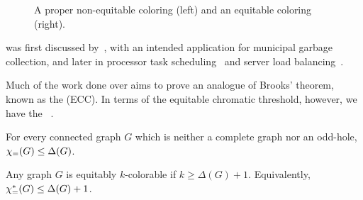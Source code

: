 \begin{figure}[!htb]
    \centering
    \hfill
    \hfill
    
    \caption{A proper non-equitable coloring (left) and an equitable coloring (right).}
    \label{fig:eq_color}
\end{figure}


 was first discussed by~\citep{first_equitable}, with an intended application for municipal garbage collection, and later in processor task scheduling~\citep{mutual_exclusion_scheduling} and server load balancing~\citep{domain_decomposition}.

Much of the work done over  aims to prove an analogue of Brooks' theorem, known as the  (ECC).
In terms of the equitable chromatic threshold, however, we have the ~\citep{hajnal_szmeredi_theorem}.

\begin{conjecture*}[ECC]
    For every connected graph $G$ which is neither a complete graph nor an odd-hole, $\chi_{\mathcal{=}}(G) \leq \Delta(G)$.
\end{conjecture*}

\begin{theorem*}
    Any graph $G$ is equitably $k$-colorable if $k \geq \Delta(G) + 1$. Equivalently, $\chi_{\mathcal{=}}^*(G) \leq \Delta(G) + 1$.
\end{theorem*}

